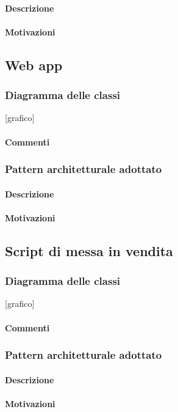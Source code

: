\documentclass[a4paper, 12pt]{article}
\begin{document}
\paragraph{Descrizione}
\paragraph{Motivazioni}

\subsection{Web app}
\subsubsection{Diagramma delle classi}
[grafico]
\paragraph{Commenti}
\subsubsection{Pattern architetturale adottato}
\paragraph{Descrizione}
\paragraph{Motivazioni}

\subsection{Script di messa in vendita}
\subsubsection{Diagramma delle classi}
[grafico]
\paragraph{Commenti}
\subsubsection{Pattern architetturale adottato}
\paragraph{Descrizione}
\paragraph{Motivazioni}
\end{document}

